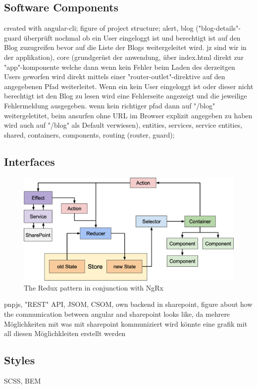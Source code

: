 \documentclass[Bachelor,BIF,english]{twbook}
\begin{document}
\subsection{Software Components}
created with angular-cli;
figure of project structure;
alert, blog ("blog-details"-guard überprüft nochmal ob ein User eingeloggt ist und berechtigt ist auf den Blog zuzugreifen bevor auf die Liste der Blogs weitergeleitet wird. jz sind wir in der applikation), core (grundgerüst der anwendung, über index.html direkt zur "app"-komponente welche dann wenn kein Fehler beim Laden des derzeitgen Users geworfen wird direkt mittels einer "router-outlet"-direktive auf den angegebenen Pfad weiterleitet. Wenn ein kein User eingeloggt ist oder dieser nicht berechtigt ist den Blog zu lesen wird eine Fehlerseite angezeigt und die jeweilige Fehlermeldung ausgegeben. wenn kein richtiger pfad dann auf "/blog" weitergeletitet, beim ansurfen ohne URL im Browser explizit angegeben zu haben wird auch auf "/blog" als Default verwiesen), entities, services, service entities, shared, containers, components, routing (router, guard); 

\subsection{Interfaces}
\begin{figure}[!htbp]
\centering
\includegraphics[width=0.75\linewidth]{PICs/ngrx_redux_structure.eps}
\caption{The Redux pattern in conjunction with NgRx}\label{Fig6}
\end{figure}
pnpjs, "REST" API, JSOM, CSOM, own backend in sharepoint, figure about how the communication between angular and sharepoint looks like, da mehrere Möglichkeiten mit was mit sharepoint kommuniziert wird könnte eine grafik mit all diesen Möglichkleiten erstellt werden

\subsection{Styles}
SCSS, BEM
\end{document}
